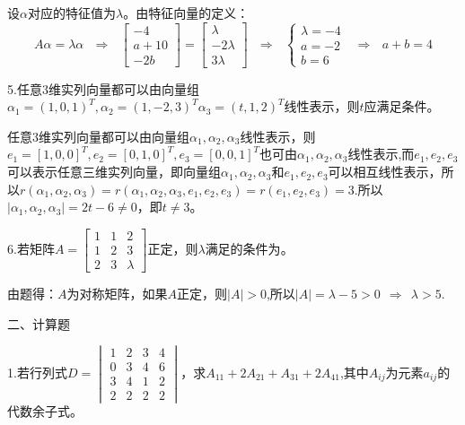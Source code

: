 \documentclass{article}
\begin{document}
\begin{jie}
设$\alpha$对应的特征值为$\lambda$。由特征向量的定义：
\begin{equation*}
A\alpha=\lambda\alpha~~~\Rightarrow~~~
\begin{bmatrix}
-4 \\ a+10 \\ -2b
\end{bmatrix}=
\begin{bmatrix}
\lambda \\ -2\lambda \\ 3\lambda
\end{bmatrix}~~~\Rightarrow ~~~
\begin{cases}
\lambda=-4\\
a=-2\\
b=6
\end{cases}~~~\Rightarrow~~~a+b=4
\end{equation*}
\end{jie}

5.任意3维实列向量都可以由向量组$\alpha_{1}=(1,0,1)^{T},\alpha_{2}=(1,-2,3)^{T}\alpha_{3}=(t,1,2)^{T}$线性表示，则$t$应满足条件\underline{\hphantom{~~~~~~~~~~}}。

\begin{jie}
任意3维实列向量都可以由向量组$\alpha_{1},\alpha_{2},\alpha_{3}$线性表示，则$e_{1}=[1,0,0]^T,e_2=[0,1,0]^T,e_3=[0,0,1]^T$也可由$\alpha_ {1},\alpha_{2},\alpha_{3}$线性表示,而$e_1,e_2,e_3$可以表示任意三维实列向量，即向量组$\alpha_ {1},\alpha_{2},\alpha_{3}$和$e_1,e_2,e_3$可以相互线性表示，所以$r(\alpha_ {1},\alpha_{2},\alpha_{3})=r(\alpha_ {1},\alpha_{2},\alpha_{3},e_1,e_2,e_3)=r(e_1,e_2,e_3)=3$.所以$|\alpha_ {1},\alpha_{2},\alpha_{3}|=2t-6\neq0$，即$t\neq3$。
\end{jie}

6.若矩阵$
A=
\begin{bmatrix}
  1 & 1 & 2 \\
  1 & 2 & 3\\
  2 & 3 & \lambda
\end{bmatrix}
$正定，则$\lambda$满足的条件为\underline{\hphantom{~~~~~~~~~~}}。

\begin{jie}
由题得：$A$为对称矩阵，如果$A$正定，则$|A|>0$,所以$|A|=\lambda-5>0~~\Rightarrow~~\lambda>5$.
\end{jie}

二、计算题

1.若行列式$D=
\begin{vmatrix}
  1 & 2 & 3 & 4 \\
  0 & 3 & 4 & 6 \\
  3 & 4 & 1 & 2 \\
  2 & 2 & 2 & 2
\end{vmatrix}
$，求$A_{11}+2A_{21}+A_{31}+2A_{41}$,其中$A_{ij}$为元素$a_{ij}$的代数余子式。
\end{document}
